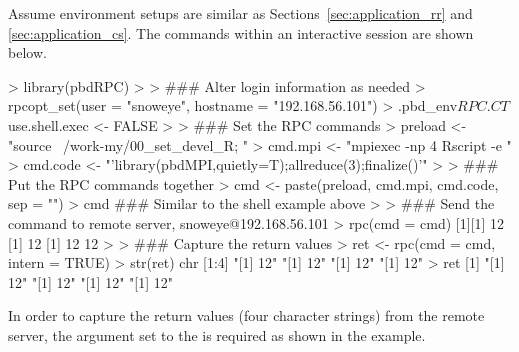 Assume environment setups are similar as Sections~\ref{sec:application_rr} and
\ref{sec:application_cs}.
The  commands within an interactive  session
are shown below.
\begin{Code}[title=\pkg{pbdRPC} in local and \pkg{pbdMPI} in remote]
> library(pbdRPC)
>
> ### Alter login information as needed
> rpcopt_set(user = "snoweye", hostname = "192.168.56.101")
> .pbd_env$RPC.CT$use.shell.exec <- FALSE
>
> ### Set the RPC commands
> preload <- "source ~/work-my/00_set_devel_R; "
> cmd.mpi <- "mpiexec -np 4 Rscript -e "
> cmd.code <- "'library(pbdMPI,quietly=T);allreduce(3);finalize()'"
>
> ### Put the RPC commands together
> cmd <- paste(preload, cmd.mpi, cmd.code, sep = "")
> cmd  ### Similar to the shell example above
>
> ### Send the command to remote server, snoweye@192.168.56.101
> rpc(cmd = cmd)
[1][1] 12
[1] 12
[1] 12
12
>
> ### Capture the return values
> ret <- rpc(cmd = cmd, intern = TRUE)
> str(ret)
 chr [1:4] "[1] 12" "[1] 12" "[1] 12" "[1] 12"
> ret
[1] "[1] 12" "[1] 12" "[1] 12" "[1] 12"
\end{Code}
In order to capture the return values (four character strings) from the
remote server, the argument  set to the 
is required as shown in the example.

